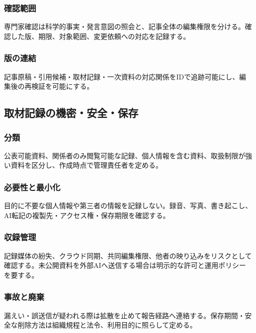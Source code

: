 \documentclass[a4paper,11pt]{article}
\begin{document}
\subsubsection{確認範囲}
\par 専門家確認は科学的事実・発言意図の照会と、記事全体の編集権限を分ける。確認した版、期限、対象範囲、変更依頼への対応を記録する。\par\medskip
\subsubsection{版の連結}
\par 記事原稿・引用候補・取材記録・一次資料の対応関係をIDで追跡可能にし、編集後の再検証を可能にする。\par\medskip
\subsection{取材記録の機密・安全・保存}
\subsubsection{分類}
\par 公表可能資料、関係者のみ閲覧可能な記録、個人情報を含む資料、取扱制限が強い資料を区分し、作成時点で管理責任者を定める。\par\medskip
\subsubsection{必要性と最小化}
\par 目的に不要な個人情報や第三者の情報を記録しない。録音、写真、書き起こし、AI転記の複製先・アクセス権・保存期限を確認する。\par\medskip
\subsubsection{収録管理}
\par 記録媒体の紛失、クラウド同期、共同編集権限、他者の映り込みをリスクとして確認する。未公開資料を外部AIへ送信する場合は明示的な許可と運用ポリシーを要する。\par\medskip
\subsubsection{事故と廃棄}
\par 漏えい・誤送信が疑われる際は拡散を止めて報告経路へ連絡する。保存期間・安全な削除方法は組織規程と法令、利用目的に照らして定める。\par\medskip
\end{document}
